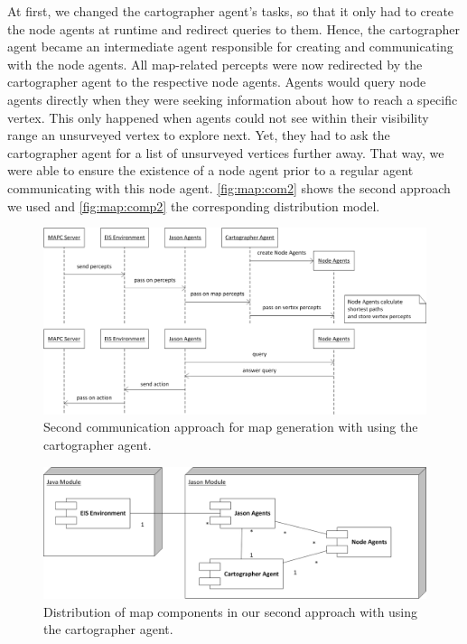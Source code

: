 At first, we changed the cartographer agent's tasks, so that it only had to create the node agents at runtime and redirect queries to them.
Hence, the cartographer agent became an intermediate agent responsible for creating and communicating with the node agents.
All map-related percepts were now redirected by the cartographer agent to the respective node agents.
Agents would query node agents directly when they were seeking information about how to reach a specific vertex.
This only happened when agents could not see within their visibility range an unsurveyed vertex to explore next.
Yet, they had to ask the cartographer agent for a list of unsurveyed vertices further away.
That way, we were able to ensure the existence of a node agent prior to a regular agent communicating with this node agent.
\autoref{fig:map:com2} shows the second approach we used and \autoref{fig:map:comp2} the corresponding distribution model.
\begin{figure}
  \centering
  \includegraphics[width=\linewidth]{images/map_com_2.png}
  \caption{Second communication approach for map generation with using the cartographer agent.}
  \label{fig:map:com2}
\end{figure}

\begin{figure}
  \centering
  \includegraphics[width=\linewidth]{images/map_comp_2.png}
  \caption{Distribution of map components in our second approach with using the cartographer agent.}
  \label{fig:map:comp2}
\end{figure}

